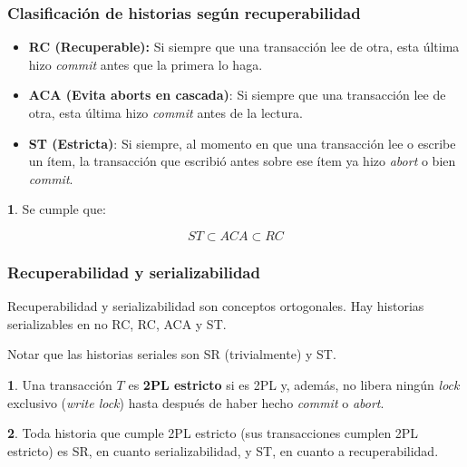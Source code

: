 \documentclass[english]{article}
\theoremstyle{definition}
\theoremstyle{definition}
\newtheorem*{defn*}{\protect\definitionname}
\providecommand{\definitionname}{Definición}
\newtheorem*{thm*}{\protect\theoremname}
\providecommand{\theoremname}{Teorema}
\begin{document}
\subsubsection{Clasificación de historias según recuperabilidad}
\begin{itemize}
	\item \textbf{RC (Recuperable):} Si siempre que una transacción lee de
        otra, esta última hizo \emph{commit} antes que la primera lo haga.
    \item \textbf{ACA (Evita aborts en cascada)}: Si siempre que una
        transacción lee de otra, esta última hizo \emph{commit} antes de la
        lectura.
    \item \textbf{ST (Estricta)}: Si siempre, al momento en que una
        transacción lee o escribe un ítem, la transacción que escribió antes
        sobre ese ítem ya hizo \emph{abort} o bien \emph{commit}.
\end{itemize}

\begin{thm*}
Se cumple que:

$$ ST \subset ACA \subset RC$$
\end{thm*}

\subsubsection{Recuperabilidad y serializabilidad}

Recuperabilidad y serializabilidad son conceptos ortogonales. Hay historias
serializables en no RC, RC, ACA y ST.

Notar que las historias seriales son SR (trivialmente) y ST.

\begin{defn*}
Una transacción $T$ es \textbf{2PL estricto} si es 2PL y, además, no libera
ningún \emph{lock} exclusivo (\emph{write lock}) hasta después de haber hecho
\emph{commit} o \emph{abort}.
\end{defn*}

\begin{thm*}
Toda historia que cumple 2PL estricto (sus transacciones cumplen 2PL estricto)
es SR, en cuanto serializabilidad, y ST, en cuanto a recuperabilidad.
\end{thm*}
\end{document}
